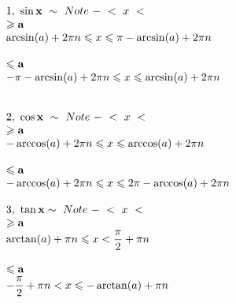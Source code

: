 \documentclass{article}
\begin{document}
\begin{multicols}{2}
\[\begin{array}{>{\displaystyle}l}
    1,\ \mathbf{\sin x} \ \sim \ Note\ -\ < \ x\ < \\
    \mathbf{\geqslant a}\\
    \arcsin( a) +2\pi n\leqslant x\leqslant \pi -\arcsin( a) +2\pi n\\
    \\
    \mathbf{\leqslant a}\\
    -\pi -\arcsin( a) +2\pi n\leqslant x\leqslant \arcsin( a) +2\pi n\\
    \\
    \\
    2,\ \mathbf{\cos x} \ \sim \ Note\ -\ < \ x\ < \\
    \mathbf{\geqslant a}\\
    -\arccos( a) +2\pi n\leqslant x\leqslant \arccos( a) +2\pi n\\
    \\
    \mathbf{\leqslant a}\\
    -\arccos( a) +2\pi n\leqslant x\leqslant 2\pi -\arccos( a) +2\pi n\\
    \\
    3,\ \mathbf{\tan x} \sim \ Note\ -\ < \ x\ < \\
    \mathbf{\geqslant a}\\
    \arctan( a) +\pi n\leqslant x< \frac{\pi }{2} +\pi n\\
    \\
    \mathbf{\leqslant a}\\
    -\frac{\pi }{2} +\pi n< x\leqslant -\arctan( a) +\pi n
    \end{array}
    \]
\end{multicols}
\end{document}
